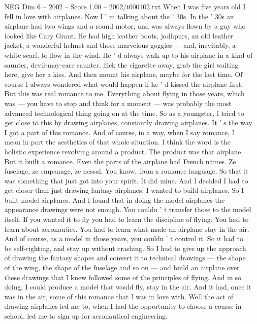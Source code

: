 \begin{textsample}{NEG Dim 6 – 2002 – Score 1.00 – 2002/t000102.txt}  \label{ex:f6_neg_072}
When I was five years old I fell in love with airplanes.
Now I ' m talking about the ' 30s.
In the ' 30s an airplane had two wings and a round motor, and was always flown by a guy who looked like Cary Grant.
He had high leather boots, jodhpurs, an old leather jacket, a wonderful helmet and those marvelous goggles — and, inevitably, a white scarf, to flow in the wind.
He ' d always walk up to his airplane in a kind of saunter, devil-may-care saunter, flick the cigarette away, grab the girl waiting here, give her a kiss.
And then mount his airplane, maybe for the last time.
Of course I always wondered what would happen if he ' d kissed the airplane first.
But this was real romance to me.
Everything about flying in those years, which was — you have to stop and think for a moment — was probably the most advanced technological thing going on at the time.
So as a youngster, I tried to get close to this by drawing airplanes, constantly drawing airplanes.
It ' s the way I got a part of this romance.
And of course, in a way, when I say romance, I mean in part the aesthetics of that whole situation.
I think the word is the holistic experience revolving around a product.
The product was that airplane.
But it built a romance.
Even the parts of the airplane had French names.
Ze fuselage, ze empanage, ze nessal.
You know, from a romance language.
So that it was something that just got into your spirit.
It did mine.
And I decided I had to get closer than just drawing fantasy airplanes.
I wanted to build airplanes.
So I built model airplanes.
And I found that in doing the model airplanes the appearance drawings were not enough.
You couldn ' t transfer those to the model itself.
If you wanted it to fly you had to learn the discipline of flying.
You had to learn about aeronautics.
You had to learn what made an airplane stay in the air.
And of course, as a model in those years, you couldn ' t control it.
So it had to be self-righting, and stay up without crashing.
So I had to give up the approach of drawing the fantasy shapes and convert it to technical drawings — the shape of the wing, the shape of the fuselage and so on — and build an airplane over these drawings that I knew followed some of the principles of flying.
And in so doing, I could produce a model that would fly, stay in the air.
And it had, once it was in the air, some of this romance that I was in love with.
Well the act of drawing airplanes led me to, when I had the opportunity to choose a course in school, led me to sign up for aeronautical engineering.

\end{textsample}
